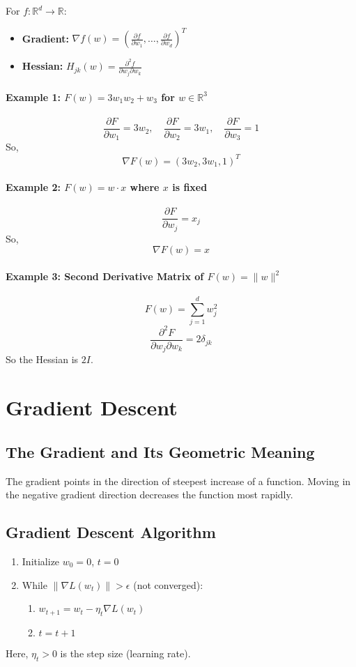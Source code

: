 \documentclass{article}
\begin{document}
For $f: \mathbb{R}^d \to \mathbb{R}$:
\begin{itemize}
    \item \textbf{Gradient:} $\nabla f(w) = \left( \frac{\partial f}{\partial w_1}, \ldots, \frac{\partial f}{\partial w_d} \right)^T$
    \item \textbf{Hessian:} $H_{jk}(w) = \frac{\partial^2 f}{\partial w_j \partial w_k}$
\end{itemize}

\paragraph{Example 1: $F(w) = 3w_1w_2 + w_3$ for $w \in \mathbb{R}^3$}
\[
\frac{\partial F}{\partial w_1} = 3w_2, \quad \frac{\partial F}{\partial w_2} = 3w_1, \quad \frac{\partial F}{\partial w_3} = 1
\]
So,
\[
\nabla F(w) = (3w_2, 3w_1, 1)^T
\]

\paragraph{Example 2: $F(w) = w \cdot x$ where $x$ is fixed}
\[
\frac{\partial F}{\partial w_j} = x_j
\]
So,
\[
\nabla F(w) = x
\]

\paragraph{Example 3: Second Derivative Matrix of $F(w) = \|w\|^2$}
\[
F(w) = \sum_{j=1}^d w_j^2
\]
\[
\frac{\partial^2 F}{\partial w_j \partial w_k} = 2\delta_{jk}
\]
So the Hessian is $2I$.
\section{Gradient Descent}

\subsection{The Gradient and Its Geometric Meaning}
The gradient points in the direction of steepest increase of a function. Moving in the negative gradient direction decreases the function most rapidly.

\subsection{Gradient Descent Algorithm}
\begin{enumerate}
    \item Initialize $w_0 = 0$, $t = 0$
    \item While $\|\nabla L(w_t)\| > \epsilon$ (not converged):
    \begin{enumerate}
        \item $w_{t+1} = w_t - \eta_t \nabla L(w_t)$
        \item $t = t + 1$
    \end{enumerate}
\end{enumerate}
Here, $\eta_t > 0$ is the step size (learning rate).
\end{document}
